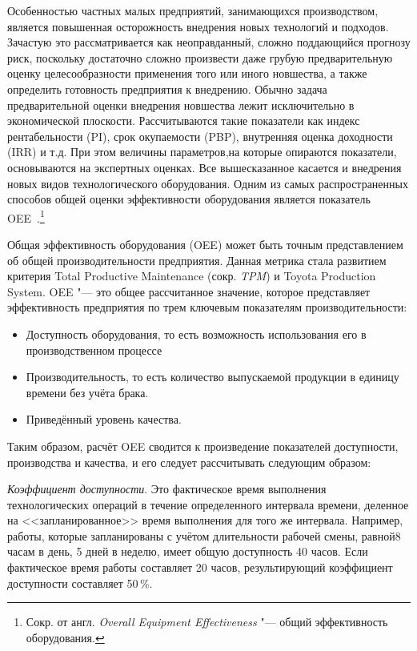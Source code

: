 Особенностью частных малых предприятий, занимающихся производством, является повышенная осторожность внедрения новых технологий и подходов. Зачастую это рассматривается как неоправданный, сложно поддающийся прогнозу риск, поскольку достаточно сложно произвести даже грубую предварительную оценку целесообразности применения того или иного новшества, а также определить готовность предприятия к внедрению. Обычно задача предварительной оценки внедрения новшества лежит исключительно в экономической плоскости. Рассчитываются такие показатели как индекс рентабельности (PI), срок окупаемости (PBP), внутренняя оценка доходности (IRR) и т.д. При этом величины параметров,на которые опираются показатели,  основываются на экспертных оценках. Все вышесказанное касается и внедрения новых видов технологического оборудования. Одним из самых распространенных способов общей оценки эффективности оборудования является показатель OEE~\cite{oee}.\footnote{Сокр. от англ. \textit{Overall Equipment Effectiveness} "--- общий эффективность оборудования.}

Общая эффективность оборудования (OEE) может быть точным представлением об общей производительности предприятия. Данная метрика стала развитием критерия Total Productive Maintenance (сокр. \textit{TPM}) и  Toyota Production System. OEE "--- это общее рассчитанное значение, которое представляет эффективность предприятия по трем ключевым показателям производительности:

\begin{itemize}
	\item Доступность оборудования, то есть возможность использования его в производственном процессе
	\item Производительность, то есть количество выпускаемой продукции в единицу времени без учёта брака.
	\item Приведённый уровень качества. 
\end{itemize}


Таким образом, расчёт OEE сводится к произведение показателей доступности, производства и качества, и его следует рассчитывать следующим образом:

\textit{Коэффициент доступности}. Это фактическое время выполнения технологических операций в течение определенного интервала времени, деленное на <<запланированное>> время выполнения для того же интервала. Например, работы, которые запланированы с учётом длительности рабочей смены, равной8 часам в день, 5 дней в неделю, имеет общую доступность 40 часов. Если фактическое время работы составляет 20 часов, результирующий коэффициент доступности составляет 50\,\%.

